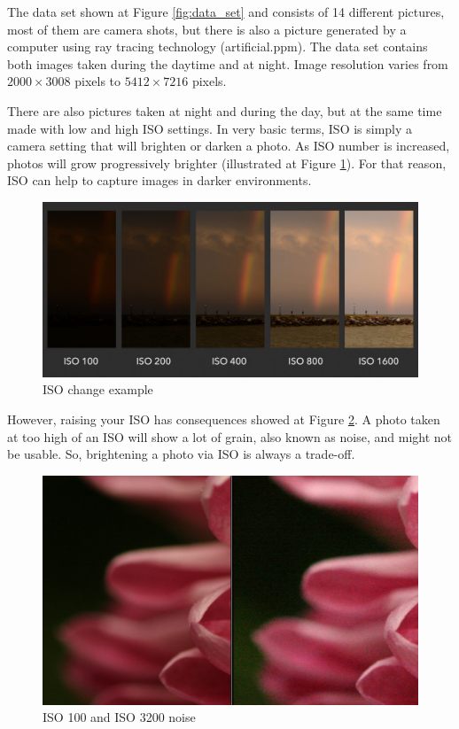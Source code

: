 The data set shown at Figure \ref{fig:data_set} and consists of 14 different pictures, most of them are camera shots, but there is also a picture generated by a computer using ray tracing technology (artificial.ppm). The data set contains both images taken during the daytime and at night. Image resolution varies from $2000 \times 3008$ pixels to $5412 \times 7216$ pixels.

There are also pictures taken at night and during the day, but at the same time made with low and high ISO settings. In very basic terms, ISO is simply a camera setting that will brighten or darken a photo. As ISO number is increased, photos will grow progressively brighter (illustrated at Figure \ref{fig:iso_example}). For that reason, ISO can help to capture images in darker environments.

\begin{figure}[H]
  \centering
  \includegraphics[width=.8\linewidth]{ISO-brightness-chart-960x448.jpeg}
  \caption{ISO change example}
  \label{fig:iso_example}
\end{figure}

However, raising your ISO has consequences showed at Figure \ref{fig:iso_noise}. A photo taken at too high of an ISO will show a lot of grain, also known as noise, and might not be usable. So, brightening a photo via ISO is always a trade-off.

\begin{figure}[H]
  \centering
  \includegraphics[width=.8\linewidth]{iso-1.jpeg}
  \caption{ISO 100 and ISO 3200 noise}
  \label{fig:iso_noise}
\end{figure}

